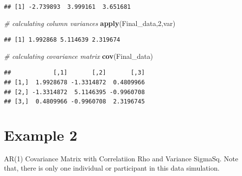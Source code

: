 \documentclass[
]{book}
\newenvironment{Shaded}{\begin{snugshade}}{\end{snugshade}}
\newcommand{\CommentTok}[1]{\textcolor[rgb]{0.56,0.35,0.01}{\textit{#1}}}
\newcommand{\DecValTok}[1]{\textcolor[rgb]{0.00,0.00,0.81}{#1}}
\newcommand{\KeywordTok}[1]{\textcolor[rgb]{0.13,0.29,0.53}{\textbf{#1}}}
\newcommand{\NormalTok}[1]{#1}
\begin{document}
\begin{verbatim}
## [1] -2.739893  3.999161  3.651681
\end{verbatim}

\begin{Shaded}
\begin{Highlighting}[]
\CommentTok{# calculating column variances}
\KeywordTok{apply}\NormalTok{(Final_data,}\DecValTok{2}\NormalTok{,var)}
\end{Highlighting}
\end{Shaded}

\begin{verbatim}
## [1] 1.992868 5.114639 2.319674
\end{verbatim}

\begin{Shaded}
\begin{Highlighting}[]
\CommentTok{# calculating covariance matrix}
\KeywordTok{cov}\NormalTok{(Final_data)}
\end{Highlighting}
\end{Shaded}

\begin{verbatim}
##            [,1]       [,2]       [,3]
## [1,]  1.9928678 -1.3314872  0.4809966
## [2,] -1.3314872  5.1146395 -0.9960708
## [3,]  0.4809966 -0.9960708  2.3196745
\end{verbatim}

\hypertarget{example-2}{%
\section{Example 2}\label{example-2}}

AR(1) Covariance Matrix with Correlatiion Rho and Variance SigmaSq. Note that, there is only one individual or participant in this data simulation.
\end{document}
